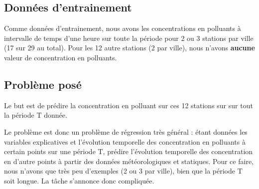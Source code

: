 \subsection{Données d'entrainement}

Comme données d'entrainement, nous avons les concentrations en polluants à intervalle de temps d'une heure sur toute la période pour 2 ou 3 stations par ville (17 sur 29 au total).
Pour les 12 autre stations (2 par ville), nous n'avons \textbf{aucune} valeur de concentration en polluants.

\subsection{Problème posé}

Le but est de prédire la concentration en polluant sur ces 12 stations sur sur tout la période T donnée.

Le problème est donc un problème de régression très général : étant données les variables explicatives et l'évolution temporelle des concentration en polluants à certain points sur une période T, prédire l'évolution temporelle des concentration en d'autre points à partir des données météorologiques et statiques.
Pour ce faire, nous n'avons que très peu d'exemples (2 ou 3 par ville), bien que la période T soit longue.
La tâche s'annonce donc compliquée.

